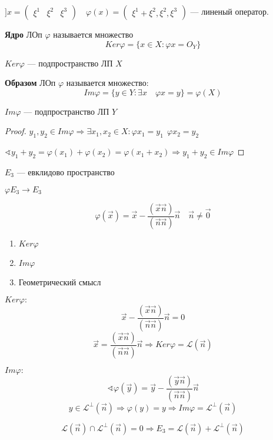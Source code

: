 

\cfoot{}



$] x = \begin{pmatrix}
        \xi^1 & \xi^2 & \xi^3
    \end{pmatrix} \quad \varphi(x) = \begin{pmatrix}
        \xi^1+\xi^2, \xi^2, \xi^3
    \end{pmatrix}$ --- линеный оператор.

\begin{definition}
    \textbf{Ядро} ЛОп $\varphi$ называется множество
    $$Ker \varphi = \{ x\in X : \varphi x = O_Y\}$$
\end{definition}
\begin{remark}
    $Ker \varphi$ --- подпространство ЛП $X$
\end{remark}

\begin{definition}
    \textbf{Образом} ЛОп $\varphi$ называется множество:
    $$Im \varphi = \{y\in Y : \exists x \quad \varphi x = y\} = \varphi(X)$$
\end{definition}
\begin{remark}
    $Im \varphi$ --- подпространство ЛП $Y$
\end{remark}
\begin{proof}
    $y_1, y_2\in Im \varphi \Rightarrow \exists x_1, x_2 \in X : \varphi x_1=y_1 \ \ \varphi x_2 = y_2$

    $\sphericalangle y_1 + y_2 = \varphi(x_1) + \varphi(x_2) = \varphi(x_1+x_2) \Rightarrow y_1+y_2\in Im \varphi$
\end{proof}

\begin{example}
    $E_3$ --- евклидово пространство

    $\varphi E_3 \to E_3$

    $$\varphi(\vec x) = \vec x - \frac{(\vec x \vec n)}{(\vec n \vec n)}\vec n \quad \vec n\not=\vec 0$$

    \begin{enumerate}
        \item $Ker \varphi$
        \item $Im \varphi$
        \item Геометрический смысл
    \end{enumerate}

    $Ker \varphi:$
    $$\vec x - \frac{(\vec x \vec n)}{(\vec n \vec n)}\vec n=0$$
    $$\vec x = \frac{(\vec x \vec n)}{(\vec n \vec n)}\vec n \Rightarrow Ker \varphi = \mathcal{L}(\vec n)$$

    $Im \varphi:$
    $$\sphericalangle \varphi(\vec y) = \vec y - \frac{(\vec y \vec n)}{(\vec n \vec n)}\vec n$$
    $$y\in\mathcal{L}^\perp (\vec n) \Rightarrow \varphi(y) = y \Rightarrow Im \varphi = \mathcal{L}^\perp (\vec n)$$

    $$\mathcal{L}(\vec n)\cap\mathcal{L}^\perp(\vec n)=0 \Rightarrow E_3=\mathcal{L}(\vec n) + \mathcal{L}^\perp(\vec n)$$
\end{example}

